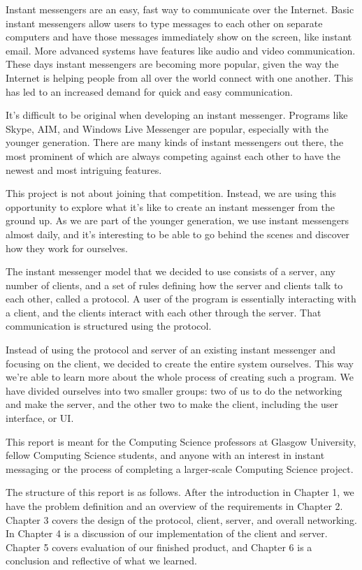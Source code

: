Instant messengers are an easy, fast way to communicate over the Internet. Basic instant messengers allow users to type messages to each other on separate computers and have those messages immediately show on the screen, like instant email. More advanced systems have features like audio and video communication. These days instant messengers are becoming more popular, given the way the Internet is helping people from all over the world connect with one another. This has led to an increased demand for quick and easy communication.

It's difficult to be original when developing an instant messenger. Programs like Skype, AIM, and Windows Live Messenger are popular, especially with the younger generation. There are many kinds of instant messengers out there, the most prominent of which are always competing against each other to have the newest and most intriguing features.

This project is not about joining that competition. Instead, we are using this opportunity to explore what it's like to create an instant messenger from the ground up. As we are part of the younger generation, we use instant messengers almost daily, and it's interesting to be able to go behind the scenes and discover how they work for ourselves.

The instant messenger model that we decided to use consists of a server, any number of clients, and a set of rules defining how the server and clients talk to each other, called a protocol. A user of the program is essentially interacting with a client, and the clients interact with each other through the server. That communication is structured using the protocol.

Instead of using the protocol and server of an existing instant messenger and focusing on the client, we decided to create the entire system ourselves. This way we're able to learn more about the whole process of creating such a program. We have divided ourselves into two smaller groups: two of us to do the networking and make the server, and the other two to make the client, including the user interface, or UI.

This report is meant for the Computing Science professors at Glasgow University, fellow Computing Science students, and anyone with an interest in instant messaging or the process of completing a larger-scale Computing Science project.

The structure of this report is as follows. After the introduction in Chapter 1, we have the problem definition and an overview of the requirements in Chapter 2. Chapter 3 covers the design of the protocol, client, server, and overall networking. In Chapter 4 is a discussion of our implementation of the client and server. Chapter 5 covers evaluation of our finished product, and Chapter 6 is a conclusion and reflective of what we learned.

